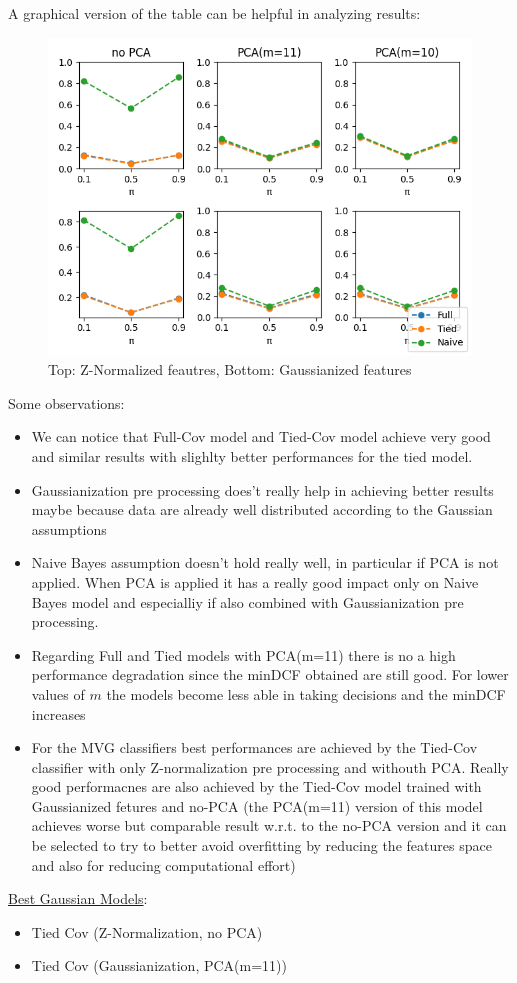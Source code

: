 \documentclass[10pt, a4paper, twocolumn]{article} %
\begin{document}
A graphical version of the table can be helpful in analyzing results:
\begin{figure}[ht!]
	\includegraphics[width=\linewidth]{./Pictures/FeaturesAnalysis/gaumodels.png}
	\caption{Top: Z-Normalized feautres, Bottom: Gaussianized features}
	\label{gauplots} 
\end{figure}

Some observations:
\begin{itemize}
	\item We can notice that Full-Cov model and Tied-Cov model achieve very good and similar results with
		  slighlty better performances for the tied model.
	\item Gaussianization pre processing does't really help in achieving better results maybe
		  because data are already well distributed according to the Gaussian assumptions
	\item Naive Bayes assumption doesn't hold really well, in particular if PCA is not applied. When 
		  PCA is applied it has a really good impact only on Naive Bayes model and especialliy if also
		  combined with Gaussianization pre processing.
	\item Regarding Full and Tied models with PCA(m=11) there is no a high performance degradation
		  since the minDCF obtained are still good. For lower values of $m$ the models become less
		  able in taking decisions and the minDCF increases
	\item For the MVG classifiers best performances are achieved by the Tied-Cov classifier with
		  only Z-normalization pre processing and withouth PCA. Really good performacnes are also
		  achieved by the Tied-Cov model trained with Gaussianized
		  fetures and no-PCA (the PCA(m=11) version of this model achieves worse but comparable result w.r.t. to the no-PCA version
		  and it can be selected to try to better avoid overfitting by reducing the features 
		  space and also for reducing computational effort)
\end{itemize}
\underline{Best Gaussian Models}: 
\begin{itemize}
	\item Tied Cov (Z-Normalization, no PCA)
	\item Tied Cov (Gaussianization, PCA(m=11))
\end{itemize}
\end{document}
